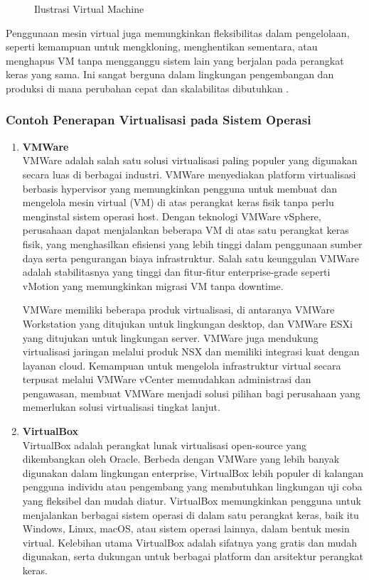 \documentclass[12pt]{article}
\begin{document}
\begin{enumerate}
\begin{figure}[h]
        \caption{Ilustrasi Virtual Machine}
    \end{figure}
    Penggunaan mesin virtual juga memungkinkan fleksibilitas dalam pengelolaan, seperti kemampuan untuk mengkloning, menghentikan sementara, atau menghapus VM tanpa mengganggu sistem lain yang berjalan pada perangkat keras yang sama. Ini sangat berguna dalam lingkungan pengembangan dan produksi di mana perubahan cepat dan skalabilitas dibutuhkan \cite{satra2023}.
\end{enumerate}

\subsubsection{Contoh Penerapan Virtualisasi pada Sistem Operasi}
\begin{enumerate}
    \item \textbf{VMWare} \\
    VMWare adalah salah satu solusi virtualisasi paling populer yang digunakan secara luas di berbagai industri. VMWare menyediakan platform virtualisasi berbasis hypervisor yang memungkinkan pengguna untuk membuat dan mengelola mesin virtual (VM) di atas perangkat keras fisik tanpa perlu menginstal sistem operasi host. Dengan teknologi VMWare vSphere, perusahaan dapat menjalankan beberapa VM di atas satu perangkat keras fisik, yang menghasilkan efisiensi yang lebih tinggi dalam penggunaan sumber daya serta pengurangan biaya infrastruktur. Salah satu keunggulan VMWare adalah stabilitasnya yang tinggi dan fitur-fitur enterprise-grade seperti vMotion yang memungkinkan migrasi VM tanpa downtime.

    VMWare memiliki beberapa produk virtualisasi, di antaranya VMWare Workstation yang ditujukan untuk lingkungan desktop, dan VMWare ESXi yang ditujukan untuk lingkungan server. VMWare juga mendukung virtualisasi jaringan melalui produk NSX dan memiliki integrasi kuat dengan layanan cloud. Kemampuan untuk mengelola infrastruktur virtual secara terpusat melalui VMWare vCenter memudahkan administrasi dan pengawasan, membuat VMWare menjadi solusi pilihan bagi perusahaan yang memerlukan solusi virtualisasi tingkat lanjut.

    \item \textbf{VirtualBox} \\
    VirtualBox adalah perangkat lunak virtualisasi open-source yang dikembangkan oleh Oracle. Berbeda dengan VMWare yang lebih banyak digunakan dalam lingkungan enterprise, VirtualBox lebih populer di kalangan pengguna individu atau pengembang yang membutuhkan lingkungan uji coba yang fleksibel dan mudah diatur. VirtualBox memungkinkan pengguna untuk menjalankan berbagai sistem operasi di dalam satu perangkat keras, baik itu Windows, Linux, macOS, atau sistem operasi lainnya, dalam bentuk mesin virtual. Kelebihan utama VirtualBox adalah sifatnya yang gratis dan mudah digunakan, serta dukungan untuk berbagai platform dan arsitektur perangkat keras.


\end{enumerate}
\end{document}
